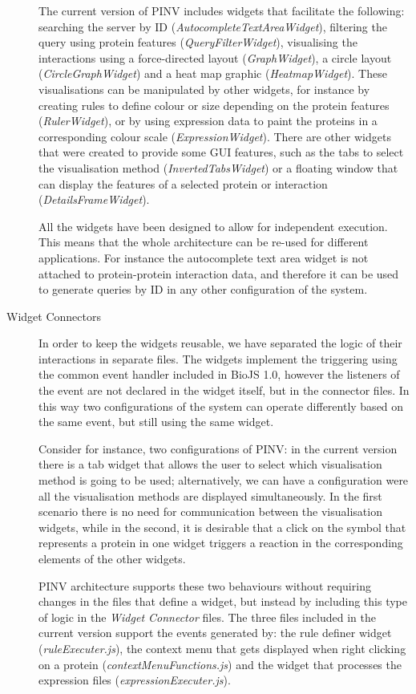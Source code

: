 \begin{description}
The current version of PINV includes widgets that facilitate the following: searching the server by ID (\emph{AutocompleteTextAreaWidget}), filtering the query using protein features (\emph{QueryFilterWidget}), visualising the interactions using a force-directed layout (\emph{GraphWidget}), a circle layout (\emph{CircleGraphWidget}) and a heat map graphic (\emph{HeatmapWidget}). These visualisations can be manipulated by other widgets, for instance by creating rules to define colour or size  depending on the protein features (\emph{RulerWidget}), or by using expression data to paint the proteins in a corresponding colour scale (\emph{ExpressionWidget}). There are other widgets that were created to provide some GUI features, such as the tabs to select the visualisation method (\emph{InvertedTabsWidget}) or a floating window that can display the features of a selected protein or interaction (\emph{DetailsFrameWidget}).

All the widgets have been designed to allow for independent execution. This means that the whole architecture can be re-used for different applications. For instance the autocomplete text area widget is not attached to protein-protein interaction data, and therefore it can be used to generate queries by ID in any other configuration of the system.

\item[Widget Connectors]
In order to keep the widgets reusable, we have separated the logic of their interactions in separate files. The widgets implement the triggering using the common event handler included in BioJS 1.0, however the listeners of the event are not declared in the widget itself, but in the connector files. In this way two configurations of the system can operate differently based on the same event, but still using the same widget. 

Consider for instance, two configurations of PINV: in the current version there is a tab widget that allows the user to select which visualisation method is going to be used; alternatively, we can have a configuration were all the visualisation methods are displayed simultaneously. In the first scenario there is no need for communication between the visualisation widgets, while in the second, it is desirable that a click on the symbol that represents a protein in one widget triggers a reaction in the corresponding elements of the other widgets. 

PINV architecture supports these two behaviours without requiring changes in the files that define a widget, but instead by including this type of logic in the \emph{Widget Connector} files. The three files included in the current version support the events generated by: the rule definer widget (\emph{ruleExecuter.js}), the context menu that gets displayed when right clicking on a protein (\emph{contextMenuFunctions.js}) and the widget that processes the expression files  (\emph{expressionExecuter.js}).


\end{description}
